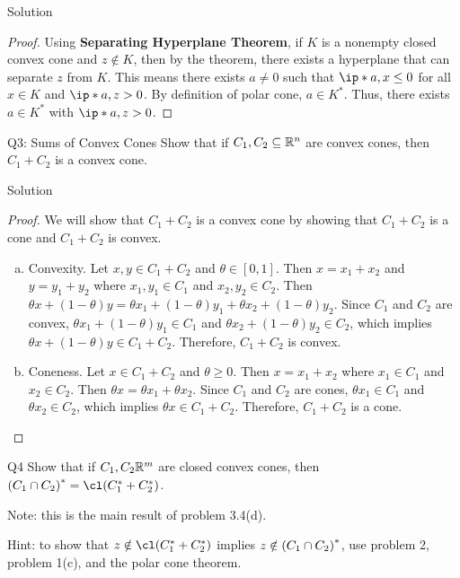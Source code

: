 \documentclass{article}
\begin{document}
\begin{solution}
    {Solution}
    \begin{proof}
        Using \textbf{Separating Hyperplane Theorem}, if $K$ is a nonempty closed convex cone and $z\notin K$, then by the theorem, there exists a hyperplane that can separate $z$ from $K$. This means there exists $a\neq 0$ such that $\ip*{a, x}\leq 0$ for all $x\in K$ and $\ip*{a, z}>0$. By definition of polar cone, $a\in K^*$. Thus, there exists $a\in K^*$ with $\ip*{a,z}>0$.
    \end{proof}
\end{solution}

\begin{problem}
    {Q3: Sums of Convex Cones}
    Show that if $C_1, C_2\subseteq \R^n$ are convex cones, then $C_1+C_2$ is a convex cone.
\end{problem}

\begin{solution}
    {Solution}
    \begin{proof}
    We will show that $C_1+C_2$ is a convex cone by showing that $C_1+C_2$ is a cone and $C_1+C_2$ is convex.
    \begin{enumerate}[(a)]
        \item Convexity. {
                Let $x,y\in C_1+C_2$ and $\theta\in[0,1]$. Then $x=x_1+x_2$ and $y=y_1+y_2$ where $x_1,y_1\in C_1$ and $x_2,y_2\in C_2$. Then $\theta x+(1-\theta)y=\theta x_1+(1-\theta)y_1+\theta x_2+(1-\theta)y_2$. Since $C_1$ and $C_2$ are convex, $\theta x_1+(1-\theta)y_1\in C_1$ and $\theta x_2+(1-\theta)y_2\in C_2$, which implies $\theta x+(1-\theta)y\in C_1+C_2$. Therefore, $C_1+C_2$ is convex.
        }
        \item Coneness. {
                Let $x\in C_1+C_2$ and $\theta\geq 0$. Then $x=x_1+x_2$ where $x_1\in C_1$ and $x_2\in C_2$. Then $\theta x=\theta x_1+\theta x_2$. Since $C_1$ and $C_2$ are cones, $\theta x_1\in C_1$ and $\theta x_2\in C_2$, which implies $\theta x\in C_1+C_2$. Therefore, $C_1+C_2$ is a cone.
        }
    \end{enumerate}
\end{proof}
\end{solution}

\begin{problem}
    {Q4}
    Show that if $C_1, C_2 \R^m$ are closed convex cones, then $\parens*{C_1\cap C_2}^*=\cl \parens*{C_1^*+C_2^*}$.

    Note: this is the main result of problem 3.4(d).

    Hint: to show that $z\notin\cl(C_1^*+C_2^*)$ implies $z\notin \parens*{C_1\cap C_2}^*$, use problem 2, problem 1(c), and the polar cone theorem.
\end{problem}
\end{document}
